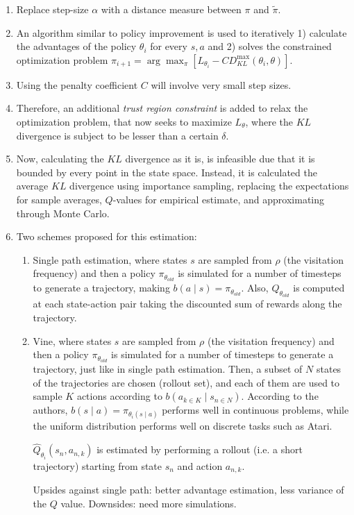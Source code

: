 \documentclass[12pt, english]{article}
\begin{document}
\begin{enumerate}
  \item Replace step-size $\alpha$ with a distance measure between $\pi$ and $\tilde{\pi}$.
  \item An algorithm similar to policy improvement is used to iteratively 1) calculate the advantages of the policy $\theta_i$ for every $s,a$ and 2) solves the constrained optimization problem $\pi_{i+1} = \arg\max_\pi [L_{\theta_i} - C D_{KL}^{\max}(\theta_i, \theta)]$.
  \item Using the penalty coefficient $C$ will involve very small step sizes.
  \item Therefore, an additional \textit{trust region constraint} is added to relax the optimization problem, that now seeks to maximize $L_{\theta}$, where the $KL$ divergence is subject to be lesser than a certain $\delta$.
  \item Now, calculating the $KL$ divergence as it is, is infeasible due that it is bounded by every point in the state space.
  Instead, it is calculated the average $KL$ divergence using importance sampling, replacing the expectations for sample averages, $Q$-values for empirical estimate, and approximating through Monte Carlo.
  \item Two schemes proposed for this estimation:

  \begin{enumerate}
    \item Single path estimation, where states $s$ are sampled from $\rho$ (the visitation frequency) and then a policy $\pi_{\theta_{old}}$ is simulated for a number of timesteps to generate a trajectory, making $b(a \mid s) = \pi_{\theta_{old}}$.
    Also, $Q_{\theta_{old}}$ is computed at each state-action pair taking the discounted sum of rewards along the trajectory.

    \item Vine, where states $s$ are sampled from $\rho$ (the visitation frequency) and then a policy $\pi_{\theta_{old}}$ is simulated for a number of timesteps to generate a trajectory, just like in single path estimation.
    Then, a subset of $N$ states of the trajectories are chosen (rollout set), and each of them are used to sample $K$ actions according to $b(a_{k \in K} \mid s_{n \in N})$. According to the authors, $b(s \mid a) = \pi_{\theta_i (s \mid a)}$ performs well in continuous problems, while the uniform distribution performs well on discrete tasks such as Atari.

    $\hat{Q}_{\theta_i}(s_n, a_{n,k})$ is estimated by performing a rollout (i.e. a short trajectory) starting from state $s_n$ and action $a_{n,k}$.

    Upsides against single path: better advantage estimation, less variance of the $Q$ value.
    Downsides: need more simulations.
  \end{enumerate}

\end{enumerate}
\end{document}
